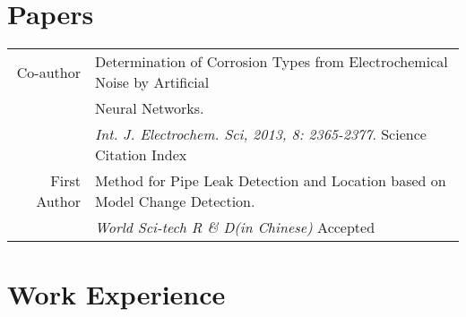 \documentclass[a4paper,10pt]{article} %
\begin{document}
\section{Papers}
\begin{tabular}{rl}
Co-author & Determination of Corrosion Types from Electrochemical Noise by Artificial \\
& Neural Networks. \\
&\emph{Int. J. Electrochem. Sci, 2013, 8: 2365-2377}.   {\hfill \footnotesize{Science Citation Index}}\\
First Author &  Method for Pipe Leak Detection and Location based on Model Change Detection. \\
&\emph{World Sci-tech R \& D(in Chinese)}    {\hfill  \footnotesize{Accepted}}\\
\end{tabular}


\section{Work Experience}
\end{document}
